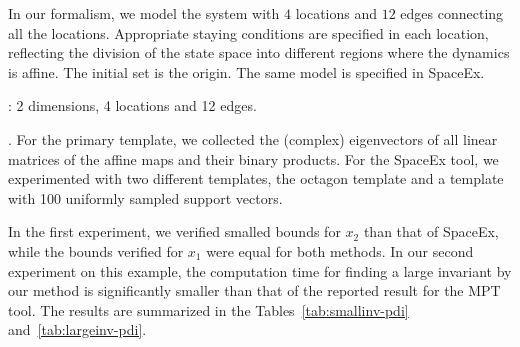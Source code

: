 In our formalism, we model the system with $4$ locations and $12$
edges connecting all the locations.  Appropriate staying conditions
are specified in each location, reflecting the division of the state
space into different regions where the dynamics is affine. The initial
set is the origin. The same model is specified in SpaceEx.

: 2 dimensions, 4 locations and 12 edges.

.  For the primary template, we collected the
(complex) eigenvectors of all linear matrices of the affine maps and
their binary products. For the SpaceEx tool, we experimented with two
different templates, the octagon template and a template with 100
uniformly sampled support vectors.

  In the first experiment, we verified smalled bounds
for $x_2$ than that of SpaceEx, while the bounds verified for $x_1$
were equal for both methods.  In our second experiment on this
example, the computation time for finding a large invariant by our
method is significantly smaller than that of the reported result for
the MPT tool.  The results are summarized in the
Tables~\ref{tab:smallinv-pdi} and~\ref{tab:largeinv-pdi}.

